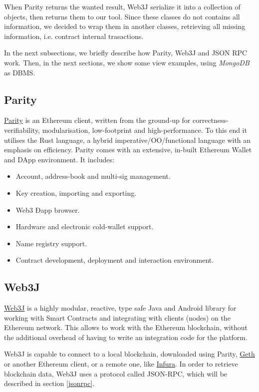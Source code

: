 When Parity returns the wanted result, Web3J serialize it into a collection of objects, then returns them to our tool. Since these classes do not contains all information, we decided to wrap them in another classes, retrieving all missing information, i.e. contract internal trasactions.

In the next subsections, we briefly describe how Parity, Web3J and JSON RPC work. Then, in the next sections, we show some view examples, using \textit{MongoDB} as DBMS.

\subsection{Parity}
\label{parity}
\href{https://www.parity.io/}{Parity} \cite{authors2017ethereum} is an Ethereum client, written from the ground-up for correctness-verifiability, modularisation, low-footprint and high-performance. \newline
To this end it utilises the Rust language, a hybrid imperative/OO/functional language with an emphasis on efficiency. 
\newline
Parity comes with an extensive, in-built Ethereum Wallet and DApp environment. It includes:
\begin{itemize}
    \item Account, address-book and multi-sig management.
    \item Key creation, importing and exporting.
    \item Web3 Ðapp browser.
    \item Hardware and electronic cold-wallet support.
    \item Name registry support.
    \item Contract development, deployment and interaction environment.
\end{itemize}

\subsection{Web3J}
\label{web3j}
\href{https://web3j.io/}{Web3J} is a highly modular, reactive, type safe Java and Android library for working with Smart Contracts and integrating with clients (nodes) on the Ethereum network. This allows to work with the Ethereum blockchain, without the additional overhead of having to write an integration code for the platform.

Web3J is capable to connect to a local blockchain, downloaded using Parity, \href{https://github.com/ethereum/go-ethereum/wiki/geth}{Geth} or another Ethereum client, or a remote one, like \href{https://infura.io}{Infura}.
In order to retrieve blockchain data, Web3J uses a protocol called JSON-RPC, which will be described in section \ref{jsonrpc}. 

